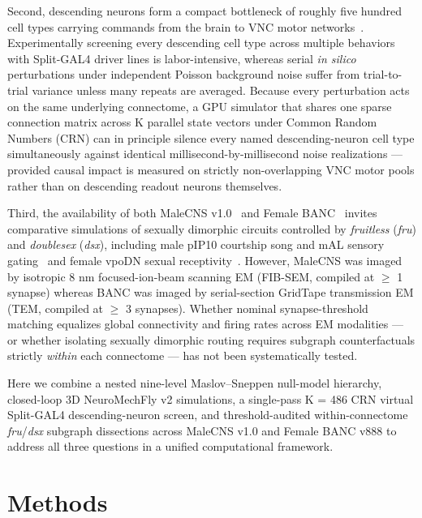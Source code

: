 \documentclass[11pt,a4paper]{article}
\begin{document}
Second, descending neurons form a compact bottleneck of roughly five hundred cell types carrying commands from the brain to VNC motor networks~\cite{bates2025banc,berg2026sexual,rayshubskiy2025steering,vonphilipsborn2011neuronal}. Experimentally screening every descending cell type across multiple behaviors with Split-GAL4 driver lines is labor-intensive, whereas serial \emph{in silico} perturbations under independent Poisson background noise suffer from trial-to-trial variance unless many repeats are averaged. Because every perturbation acts on the same underlying connectome, a GPU simulator that shares one sparse connection matrix across K parallel state vectors under Common Random Numbers (CRN) can in principle silence every named descending-neuron cell type simultaneously against identical millisecond-by-millisecond noise realizations --- provided causal impact is measured on strictly non-overlapping VNC motor pools rather than on descending readout neurons themselves.

Third, the availability of both MaleCNS v1.0~\cite{berg2026sexual} and Female BANC~\cite{bates2025banc} invites comparative simulations of sexually dimorphic circuits controlled by \emph{fruitless} (\emph{fru}) and \emph{doublesex} (\emph{dsx}), including male pIP10 courtship song and mAL sensory gating~\cite{vonphilipsborn2011neuronal,clowney2015multimodal} and female vpoDN sexual receptivity~\cite{wang2021neural}. However, MaleCNS was imaged by isotropic 8 nm focused-ion-beam scanning EM (FIB-SEM, compiled at $\geq$ 1 synapse) whereas BANC was imaged by serial-section GridTape transmission EM (TEM, compiled at $\geq$ 3 synapses). Whether nominal synapse-threshold matching equalizes global connectivity and firing rates across EM modalities --- or whether isolating sexually dimorphic routing requires subgraph counterfactuals strictly \emph{within} each connectome --- has not been systematically tested.

Here we combine a nested nine-level Maslov--Sneppen null-model hierarchy, closed-loop 3D NeuroMechFly v2 simulations, a single-pass K = 486 CRN virtual Split-GAL4 descending-neuron screen, and threshold-audited within-connectome \emph{fru}/\emph{dsx} subgraph dissections across MaleCNS v1.0 and Female BANC v888 to address all three questions in a unified computational framework.

\section{Methods}
\end{document}
